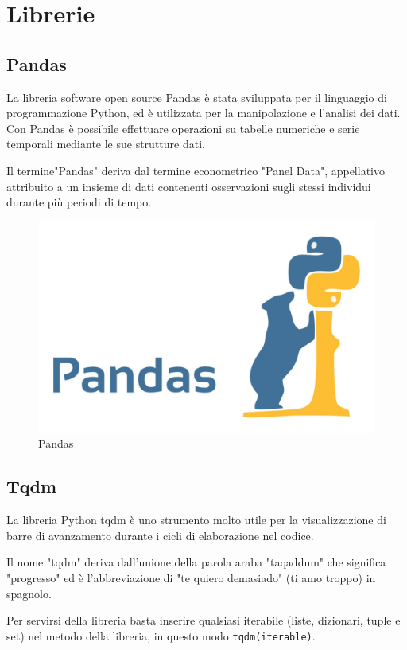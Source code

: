 \section{Librerie}
\subsection{Pandas}
La libreria software open source Pandas è stata sviluppata per il linguaggio di programmazione Python, ed è utilizzata per la manipolazione e l'analisi dei dati. Con Pandas è possibile effettuare operazioni su tabelle numeriche e serie temporali mediante le sue strutture dati. 

Il termine"Pandas" deriva dal termine econometrico "Panel Data", appellativo attribuito a un insieme di dati contenenti osservazioni sugli stessi individui durante più periodi di tempo.

\begin{figure}
    \begin{center}    
        \includegraphics[width=0.9\linewidth]{images/image4.jpeg}
        \caption{Pandas}
    \end{center}
\end{figure}

\subsection{Tqdm}
La libreria Python tqdm \cite{Tqdm} è uno strumento molto utile per la visualizzazione di barre di avanzamento durante i cicli di elaborazione nel codice. 

Il nome "tqdm" deriva dall'unione della parola araba "taqaddum" che significa "progresso" ed è l'abbreviazione di "te quiero demasiado" (ti amo troppo) in spagnolo. 

Per servirsi della libreria basta inserire qualsiasi iterabile (liste, dizionari, tuple e set) nel metodo della libreria, in questo modo \texttt{tqdm(iterable)}. 

